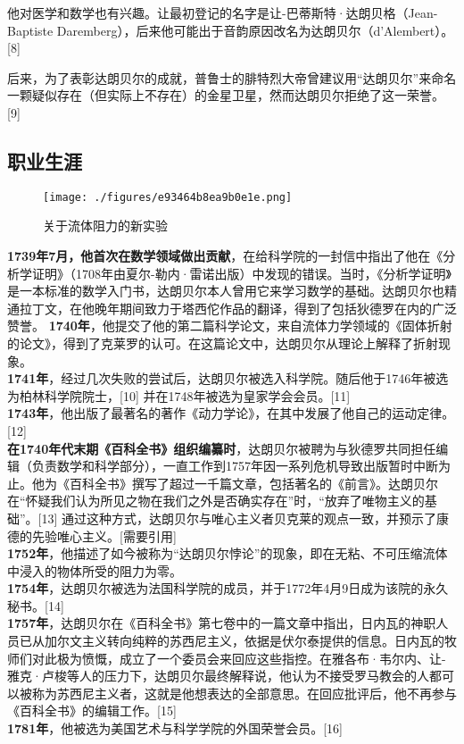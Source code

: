 他对医学和数学也有兴趣。让最初登记的名字是让-巴蒂斯特·达朗贝格（Jean-Baptiste Daremberg），后来他可能出于音韵原因改名为达朗贝尔（d’Alembert）。[8]

后来，为了表彰达朗贝尔的成就，普鲁士的腓特烈大帝曾建议用“达朗贝尔”来命名一颗疑似存在（但实际上不存在）的金星卫星，然而达朗贝尔拒绝了这一荣誉。[9]
\subsection{职业生涯}
\begin{figure}[ht]
\centering
\texttt{[image: ./figures/e93464b8ea9b0e1e.png]}
\caption{关于流体阻力的新实验} \label{fig_BR_2}
\end{figure}
\textbf{1739年7月，他首次在数学领域做出贡献}，在给科学院的一封信中指出了他在《分析学证明》（1708年由夏尔-勒内·雷诺出版）中发现的错误。当时，《分析学证明》是一本标准的数学入门书，达朗贝尔本人曾用它来学习数学的基础。达朗贝尔也精通拉丁文，在他晚年期间致力于塔西佗作品的翻译，得到了包括狄德罗在内的广泛赞誉。
\textbf{1740年}，他提交了他的第二篇科学论文，来自流体力学领域的《固体折射的论文》，得到了克莱罗的认可。在这篇论文中，达朗贝尔从理论上解释了折射现象。\\
\textbf{1741年}，经过几次失败的尝试后，达朗贝尔被选入科学院。随后他于1746年被选为柏林科学院院士，[10] 并在1748年被选为皇家学会会员。[11]\\
\textbf{1743年}，他出版了最著名的著作《动力学论》，在其中发展了他自己的运动定律。[12]\\
\textbf{在1740年代末期《百科全书》组织编纂时}，达朗贝尔被聘为与狄德罗共同担任编辑（负责数学和科学部分），一直工作到1757年因一系列危机导致出版暂时中断为止。他为《百科全书》撰写了超过一千篇文章，包括著名的《前言》。达朗贝尔在“怀疑我们认为所见之物在我们之外是否确实存在”时，“放弃了唯物主义的基础”。[13] 通过这种方式，达朗贝尔与唯心主义者贝克莱的观点一致，并预示了康德的先验唯心主义。[需要引用]\\
\textbf{1752年}，他描述了如今被称为“达朗贝尔悖论”的现象，即在无粘、不可压缩流体中浸入的物体所受的阻力为零。\\
\textbf{1754年}，达朗贝尔被选为法国科学院的成员，并于1772年4月9日成为该院的永久秘书。[14]\\
\textbf{1757年}，达朗贝尔在《百科全书》第七卷中的一篇文章中指出，日内瓦的神职人员已从加尔文主义转向纯粹的苏西尼主义，依据是伏尔泰提供的信息。日内瓦的牧师们对此极为愤慨，成立了一个委员会来回应这些指控。在雅各布·韦尔内、让-雅克·卢梭等人的压力下，达朗贝尔最终解释说，他认为不接受罗马教会的人都可以被称为苏西尼主义者，这就是他想表达的全部意思。在回应批评后，他不再参与《百科全书》的编辑工作。[15]\\
\textbf{1781年}，他被选为美国艺术与科学学院的外国荣誉会员。[16]
